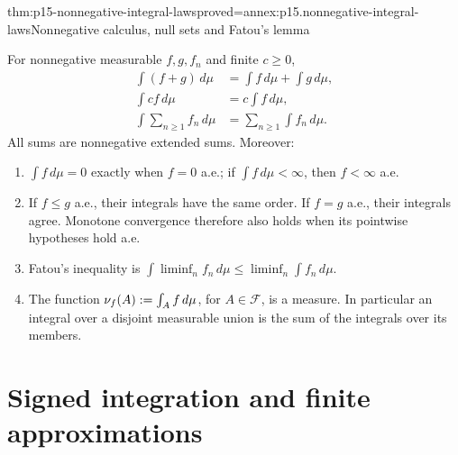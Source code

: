 \begin{hbtheorem}{thm:p15-nonnegative-integral-laws}{proved=annex:p15.nonnegative-integral-laws}{Nonnegative calculus, null sets and Fatou's lemma}
\par\nobreak
For nonnegative measurable \(f,g,f_n\) and finite \(c\geq0\),
\[
 \begin{aligned}
 \int(f+g)\,d\mu&=\int f\,d\mu+\int g\,d\mu,\\
 \int cf\,d\mu&=c\int f\,d\mu,\\
 \int\sum_{n\geq1}f_n\,d\mu&=\sum_{n\geq1}\int f_n\,d\mu.
 \end{aligned}
\]
All sums are nonnegative extended sums. Moreover:
\begin{enumerate}
\item \(\int f\,d\mu=0\) exactly when \(f=0\) a.e.; if
      \(\int f\,d\mu<\infty\), then \(f<\infty\) a.e.
\item If \(f\leq g\) a.e., their integrals have the same order.
      If \(f=g\) a.e., their integrals agree. Monotone convergence
      therefore also holds when its pointwise hypotheses hold a.e.
\item Fatou's inequality is
      \(\int\liminf_n f_n\,d\mu\leq\liminf_n\int f_n\,d\mu\).
\item The function \(\nu_f(A)\mathrel{:=}\int_A f\,d\mu\), for
      \(A\in\mathcal F\), is a measure. In particular an integral
      over a disjoint measurable union is the sum of the integrals
      over its members.
\end{enumerate}
\end{hbtheorem}

\section{Signed integration and finite approximations}
\label{sec:p15-signed-integral}

